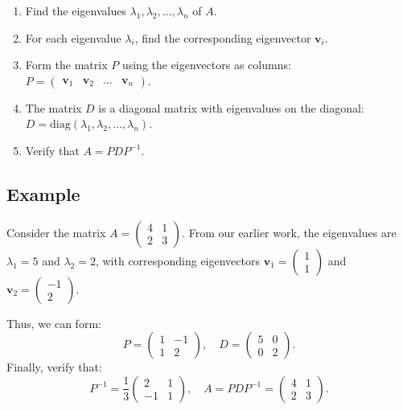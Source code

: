 \documentclass[]{article}
\begin{document}
	\begin{enumerate}
		\item Find the eigenvalues \( \lambda_1, \lambda_2, \ldots, \lambda_n \) of \( A \).
		\item For each eigenvalue \( \lambda_i \), find the corresponding eigenvector \( \mathbf{v}_i \).
		\item Form the matrix \( P \) using the eigenvectors as columns: \( P = \begin{pmatrix} \mathbf{v}_1 & \mathbf{v}_2 & \ldots & \mathbf{v}_n \end{pmatrix} \).
		\item The matrix \( D \) is a diagonal matrix with eigenvalues on the diagonal: \( D = \text{diag}(\lambda_1, \lambda_2, \ldots, \lambda_n) \).
		\item Verify that \( A = PDP^{-1} \).
	\end{enumerate}
	
	\subsection{Example}
	
	Consider the matrix \( A = \begin{pmatrix} 4 & 1 \\ 2 & 3 \end{pmatrix} \). From our earlier work, the eigenvalues are \( \lambda_1 = 5 \) and \( \lambda_2 = 2 \), with corresponding eigenvectors \( \mathbf{v}_1 = \begin{pmatrix} 1 \\ 1 \end{pmatrix} \) and \( \mathbf{v}_2 = \begin{pmatrix} -1 \\ 2 \end{pmatrix} \).
	
	Thus, we can form:
	\[
	P = \begin{pmatrix} 1 & -1 \\ 1 & 2 \end{pmatrix}, \quad D = \begin{pmatrix} 5 & 0 \\ 0 & 2 \end{pmatrix}.
	\]
	Finally, verify that:
	\[
	P^{-1} = \frac{1}{3} \begin{pmatrix} 2 & 1 \\ -1 & 1 \end{pmatrix}, \quad A = PDP^{-1} = \begin{pmatrix} 4 & 1 \\ 2 & 3 \end{pmatrix}.
	\]
	
	
\end{document}
